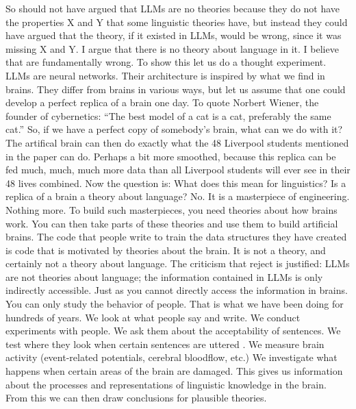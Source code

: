 So \citet{FoxKatzir2024a} should not have argued that LLMs are no theories because they do not have
the properties X and Y that some linguistic theories have, but instead they could have argued that
the theory, if it existed in LLMs, would be wrong, since it was missing X and Y. I argue that
there is no theory about language in it. I believe that \citet{AmbridgeBlything2024a} are
fundamentally wrong. To show this let us do a thought experiment. LLMs are neural networks. Their
architecture is inspired by what we find in brains. They differ from brains in various ways, but let
us assume that one could develop a perfect replica of a brain one day. To quote
Norbert Wiener, the founder of cybernetics: ``The best model of a cat is a cat, preferably the same
cat.'' \citep[320]{RosenbluethWiener1945a-u}
So, if we have a perfect copy of somebody's brain, what can we do with it? The artifical brain can then do exactly what
the 48 Liverpool students mentioned in the \citeauthor{AmbridgeBlything2024a} paper can do. Perhaps a
bit more smoothed, because this replica can be fed much, much, much more data than all Liverpool
students will ever see in their 48 lives combined. Now the question is: What does this mean for
linguistics? Is a replica of a brain a theory about language? No. It is a masterpiece of
engineering. Nothing more. To build such masterpieces, you need theories about how brains work. You can then take parts of these theories and use them to build
artificial brains. The code that people write to train the data structures they have created is code
that is motivated by theories about the brain. It is not a theory, and certainly not a theory about
language. The criticism that \citeauthor{AmbridgeBlything2024a} reject is justified: LLMs are not
theories about language; the information contained in LLMs is only indirectly accessible. Just as
you cannot directly access the information in brains. You can only study the behavior of
people. That is what we have been doing for hundreds of years. We look at what people say and write. We
conduct experiments with people. We ask them about the acceptability of sentences. We test where
they look when certain sentences are uttered \citep{TSKES96a}. We measure brain activity (event-related potentials,
cerebral bloodflow, etc.) We investigate what happens when certain areas of the brain are damaged.
This gives us information about the processes and representations of linguistic knowledge in the
brain. From this we can then draw conclusions for plausible theories.  

